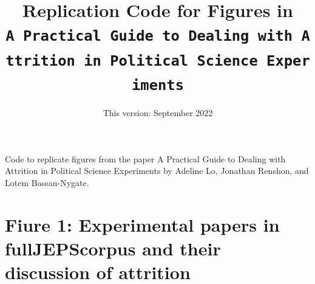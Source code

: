 \documentclass[
]{article}
\title{Replication Code for Figures in
\texttt{A\ Practical\ Guide\ to\ Dealing\ with\ Attrition\ in\ Political\ Science\ Experiments}}
\author{}
\date{\vspace{-2.5em}This version: September 2022}
\begin{document}
\maketitle

Code to replicate figures from the paper A Practical Guide to Dealing
with Attrition in Political Science Experiments by Adeline Lo, Jonathan
Renshon, and Lotem Bassan-Nygate.

\hypertarget{fiure-1-experimental-papers-in-fulljepscorpus-and-their-discussion-of-attrition}{%
\section{Fiure 1: Experimental papers in fullJEPScorpus and their
discussion of
attrition}\label{fiure-1-experimental-papers-in-fulljepscorpus-and-their-discussion-of-attrition}}
\end{document}
